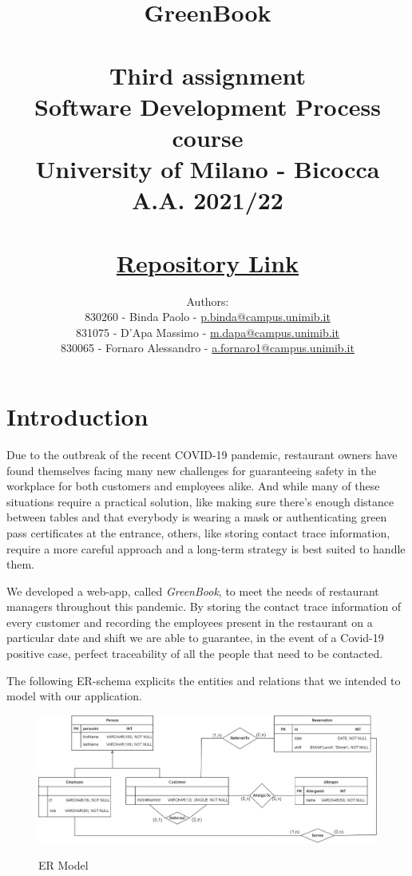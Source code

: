 \documentclass{article}
\title{\textbf{GreenBook}\\~\\
Third assignment\\
\small Software Development Process course\\
University of Milano - Bicocca\\
A.A. 2021/22\\~\\
\href{https://gitlab.com/massimino96/2021_assignment3_greenbook/}{Repository Link}}
\author{Authors:\\
830260 - Binda Paolo - \href{mailto:p.binda@campus.unimib.it}{p.binda@campus.unimib.it}\\
831075 - D'Apa Massimo - \href{mailto:m.dapa@campus.unimib.it}{m.dapa@campus.unimib.it}\\
830065 - Fornaro Alessandro - \href{mailto:a.fornaro1@campus.unimib.it}{a.fornaro1@campus.unimib.it}}
\date{}
\begin{document}
    \setlength{\parindent}{0em}
    \setlength{\parskip}{1em}

    \maketitle
    \thispagestyle{empty}

    \cleardoublepage
    \setcounter{page}{1}

    \section*{Introduction}

    Due to the outbreak of the recent COVID-19 pandemic, restaurant owners have found
    themselves facing many new challenges for guaranteeing safety in the workplace for both
    customers and employees alike. And while many of these situations require a practical
    solution, like making sure there's enough distance between tables and that everybody
    is wearing a mask or authenticating green pass certificates at the entrance, others, like
    storing contact trace information, require a more careful approach and a long-term
    strategy is best suited to handle them.


    We developed a web-app, called \textit{GreenBook}, to meet the needs of restaurant
    managers throughout this pandemic. By storing the contact trace information of every
    customer and recording the employees present in the restaurant on a particular
    date and shift we are able to guarantee, in the event of a Covid-19 positive case,
    perfect traceability of all the people that need to be contacted.


    The following ER-schema explicits the entities and relations that we intended
    to model with our application.

    \vspace{5mm}
    \begin{figure}[H]
        \centering
        \includegraphics[width=\textwidth]{images/er_model.jpg}
        \label{fig:ermodel}
        \caption{ER Model}
    \end{figure}
\end{document}

